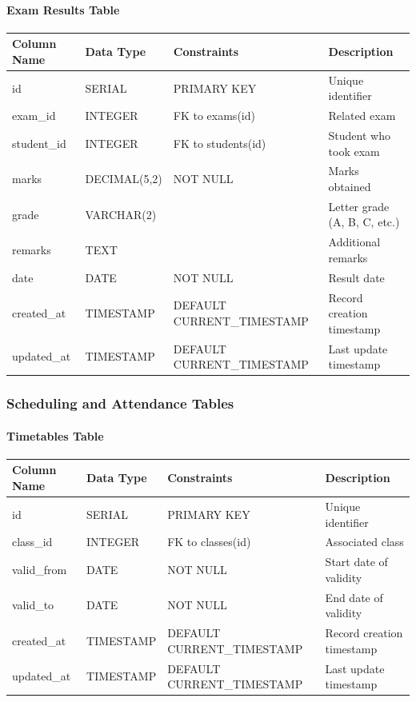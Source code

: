 \documentclass[12pt,a4paper]{report}
\begin{document}
\paragraph{Exam Results Table}
\begin{longtable}{|p{3cm}|p{3cm}|p{2cm}|p{6cm}|}
\hline
\textbf{Column Name} & \textbf{Data Type} & \textbf{Constraints} & \textbf{Description} \\
\hline
\endhead
id & SERIAL & PRIMARY KEY & Unique identifier \\
\hline
exam\_id & INTEGER & FK to exams(id) & Related exam \\
\hline
student\_id & INTEGER & FK to students(id) & Student who took exam \\
\hline
marks & DECIMAL(5,2) & NOT NULL & Marks obtained \\
\hline
grade & VARCHAR(2) & & Letter grade (A, B, C, etc.) \\
\hline
remarks & TEXT & & Additional remarks \\
\hline
date & DATE & NOT NULL & Result date \\
\hline
created\_at & TIMESTAMP & DEFAULT CURRENT\_TIMESTAMP & Record creation timestamp \\
\hline
updated\_at & TIMESTAMP & DEFAULT CURRENT\_TIMESTAMP & Last update timestamp \\
\hline
\end{longtable}

\subsubsection{Scheduling and Attendance Tables}

\paragraph{Timetables Table}
\begin{longtable}{|p{3cm}|p{3cm}|p{2cm}|p{6cm}|}
\hline
\textbf{Column Name} & \textbf{Data Type} & \textbf{Constraints} & \textbf{Description} \\
\hline
\endhead
id & SERIAL & PRIMARY KEY & Unique identifier \\
\hline
class\_id & INTEGER & FK to classes(id) & Associated class \\
\hline
valid\_from & DATE & NOT NULL & Start date of validity \\
\hline
valid\_to & DATE & NOT NULL & End date of validity \\
\hline
created\_at & TIMESTAMP & DEFAULT CURRENT\_TIMESTAMP & Record creation timestamp \\
\hline
updated\_at & TIMESTAMP & DEFAULT CURRENT\_TIMESTAMP & Last update timestamp \\
\hline
\end{longtable}
\end{document}

